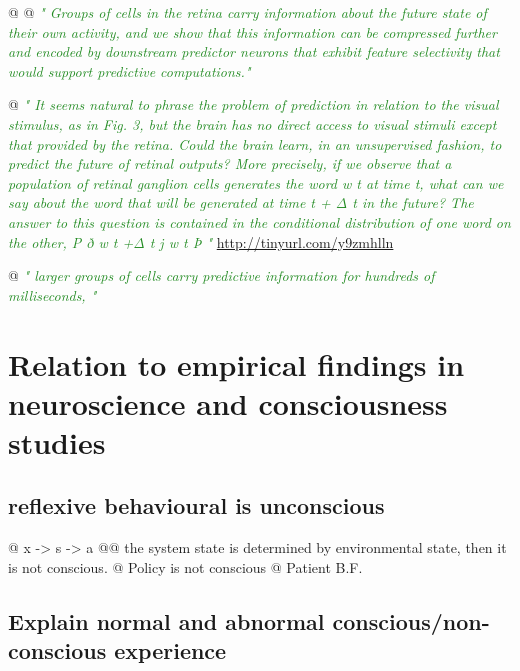 \documentclass[utf8]{article}
\newenvironment{ants}
			{
			 \begin{easylist}[itemize]
			}
			{
			\end{easylist}
			}
\newcommand{\rewrite}[1]{\textcolor{ForestGreen}{\textit{"#1"}}\newline}
\begin{document}
\begin{ants}
			
			@ \cite{Palmer2015}
			@ \rewrite{
				Groups of cells in the retina carry information about the future state of their own activity, and we show that this information can be compressed further and encoded by downstream predictor neurons that exhibit feature selectivity that would support predictive computations.}
			
			@ \rewrite{
				It seems natural to phrase the problem of prediction in relation to the visual stimulus, as in Fig. 3, but the brain has no direct access to visual stimuli except that provided by the retina. Could the brain learn, in an unsupervised fashion, to predict the future of retinal outputs? More precisely, if we observe that a population of retinal ganglion cells generates the word w t at time t, what can we say about the word that will be generated at time t + Δ t in the future? The answer to this question is contained in the conditional distribution of one word on the other, P ð w t +Δ t j w t Þ } \url{http://tinyurl.com/y9zmhlln}	
			
			@ \rewrite{
				larger groups of cells carry predictive information for hundreds of milliseconds, }
		
		\end{ants}

	\section{Relation to empirical findings in neuroscience and consciousness studies}
		\subsection{reflexive behavioural is unconscious}
			\begin{ants}
				@ x -> s -> a
					@@ the system state is determined by environmental state, then it is not conscious. 
				@ Policy is not conscious
				@ Patient B.F.
			\end{ants}
		
		\subsection{Explain normal and abnormal conscious/non-conscious experience}
		
		
\end{document}
